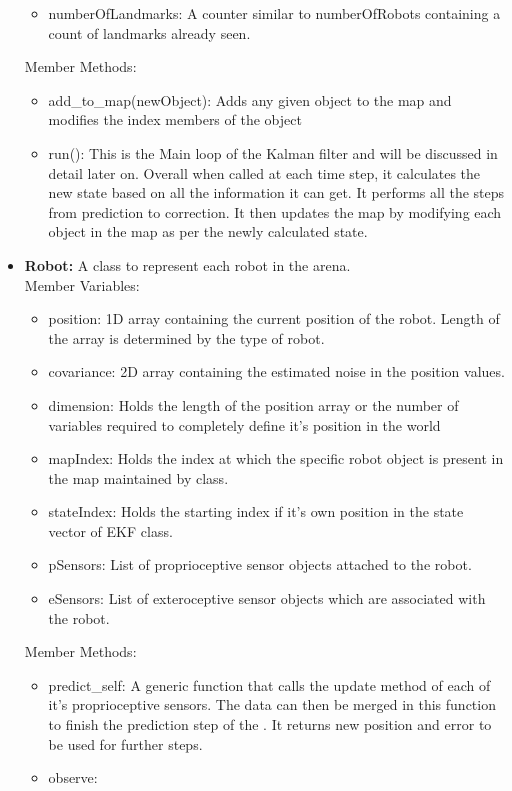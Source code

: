\begin{itemize}
\begin{itemize}
		\item numberOfLandmarks: A counter similar to numberOfRobots containing a count of landmarks already seen. 
	\end{itemize}
	Member Methods:
	\begin{itemize}
		\item add\_to\_map(newObject): Adds any given object to the map and modifies the index members of the object
		\item run(): This is the Main loop of the Kalman filter and will be discussed in detail later on. Overall when called at each time step, it calculates the new state based on all the information it can get. It performs all the steps from prediction to correction. It then updates the map by modifying each object in the map as per the newly calculated state.
	\end{itemize}
	\item \textbf{Robot:} A class to represent each robot in the arena.\\
	Member Variables:
	\begin{itemize}
		\item position: 1D array containing the current position of the robot. Length of the array is determined by the type of robot.
		\item covariance: 2D array containing the estimated noise in the position values. 
		\item dimension: Holds the length of the position array or the number of variables required to completely define it's position in the world
		\item mapIndex: Holds the index at which the specific robot object is present in the map maintained by \ekf class.
		\item stateIndex: Holds the starting index if it's own position in the state vector of EKF class.
		\item pSensors: List of proprioceptive sensor objects attached to the robot. 
		\item eSensors: List of exteroceptive sensor objects which are associated with the robot. 
	\end{itemize}
	Member Methods: 
	\begin{itemize}
		\item predict\_self: A generic function that calls the update method of each of it's proprioceptive sensors. The data can then be merged in this function to finish the prediction step of the \ekf. It returns new position and error to be used for further steps. 
		\item observe: 
	\end{itemize}
\end{itemize}